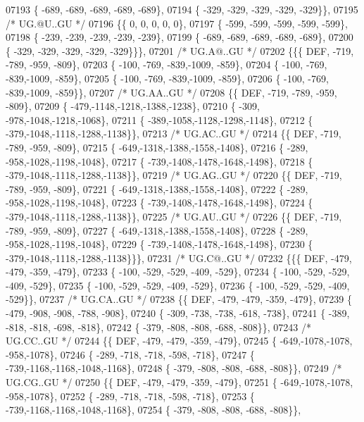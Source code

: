 \begin{DoxyCode}
07193 \{ -689, -689, -689, -689, -689\},
07194 \{ -329, -329, -329, -329, -329\}\},
07195 \textcolor{comment}{/* UG.@U..GU */}
07196 \{\{    0,    0,    0,    0,    0\},
07197 \{ -599, -599, -599, -599, -599\},
07198 \{ -239, -239, -239, -239, -239\},
07199 \{ -689, -689, -689, -689, -689\},
07200 \{ -329, -329, -329, -329, -329\}\}\},
07201 \textcolor{comment}{/* UG.A@..GU */}
07202 \{\{\{  DEF, -719, -789, -959, -809\},
07203 \{ -100, -769, -839,-1009, -859\},
07204 \{ -100, -769, -839,-1009, -859\},
07205 \{ -100, -769, -839,-1009, -859\},
07206 \{ -100, -769, -839,-1009, -859\}\},
07207 \textcolor{comment}{/* UG.AA..GU */}
07208 \{\{  DEF, -719, -789, -959, -809\},
07209 \{ -479,-1148,-1218,-1388,-1238\},
07210 \{ -309, -978,-1048,-1218,-1068\},
07211 \{ -389,-1058,-1128,-1298,-1148\},
07212 \{ -379,-1048,-1118,-1288,-1138\}\},
07213 \textcolor{comment}{/* UG.AC..GU */}
07214 \{\{  DEF, -719, -789, -959, -809\},
07215 \{ -649,-1318,-1388,-1558,-1408\},
07216 \{ -289, -958,-1028,-1198,-1048\},
07217 \{ -739,-1408,-1478,-1648,-1498\},
07218 \{ -379,-1048,-1118,-1288,-1138\}\},
07219 \textcolor{comment}{/* UG.AG..GU */}
07220 \{\{  DEF, -719, -789, -959, -809\},
07221 \{ -649,-1318,-1388,-1558,-1408\},
07222 \{ -289, -958,-1028,-1198,-1048\},
07223 \{ -739,-1408,-1478,-1648,-1498\},
07224 \{ -379,-1048,-1118,-1288,-1138\}\},
07225 \textcolor{comment}{/* UG.AU..GU */}
07226 \{\{  DEF, -719, -789, -959, -809\},
07227 \{ -649,-1318,-1388,-1558,-1408\},
07228 \{ -289, -958,-1028,-1198,-1048\},
07229 \{ -739,-1408,-1478,-1648,-1498\},
07230 \{ -379,-1048,-1118,-1288,-1138\}\}\},
07231 \textcolor{comment}{/* UG.C@..GU */}
07232 \{\{\{  DEF, -479, -479, -359, -479\},
07233 \{ -100, -529, -529, -409, -529\},
07234 \{ -100, -529, -529, -409, -529\},
07235 \{ -100, -529, -529, -409, -529\},
07236 \{ -100, -529, -529, -409, -529\}\},
07237 \textcolor{comment}{/* UG.CA..GU */}
07238 \{\{  DEF, -479, -479, -359, -479\},
07239 \{ -479, -908, -908, -788, -908\},
07240 \{ -309, -738, -738, -618, -738\},
07241 \{ -389, -818, -818, -698, -818\},
07242 \{ -379, -808, -808, -688, -808\}\},
07243 \textcolor{comment}{/* UG.CC..GU */}
07244 \{\{  DEF, -479, -479, -359, -479\},
07245 \{ -649,-1078,-1078, -958,-1078\},
07246 \{ -289, -718, -718, -598, -718\},
07247 \{ -739,-1168,-1168,-1048,-1168\},
07248 \{ -379, -808, -808, -688, -808\}\},
07249 \textcolor{comment}{/* UG.CG..GU */}
07250 \{\{  DEF, -479, -479, -359, -479\},
07251 \{ -649,-1078,-1078, -958,-1078\},
07252 \{ -289, -718, -718, -598, -718\},
07253 \{ -739,-1168,-1168,-1048,-1168\},
07254 \{ -379, -808, -808, -688, -808\}\},

\end{DoxyCode}
